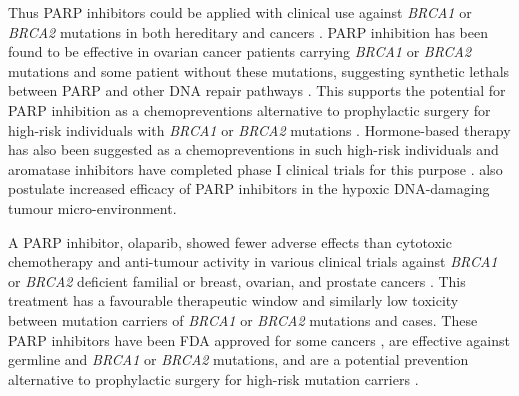 Thus \gls{PARP} inhibitors could be applied with clinical use against \textit{BRCA1} or \textit{BRCA2} \glspl{mutation} in both \gls{hereditary} and  cancers \citep{Ashworth2008, Kaelin2005}. \gls{PARP} inhibition has been found to be effective in ovarian cancer patients carrying \textit{BRCA1} or \textit{BRCA2} \glspl{mutation} and some patient without these \glspl{mutation}, suggesting \glspl{synthetic lethal} between \gls{PARP} and other \acrshort{DNA} repair \glspl{pathway} \citep{Strom2012}. This supports the potential for \gls{PARP} inhibition as a  \glspl{chemoprevention} alternative to prophylactic surgery for high-risk individuals with \textit{BRCA1} or \textit{BRCA2} \glspl{mutation} \citep{Strom2012}. Hormone-based therapy has also been suggested as a  \glspl{chemoprevention} in such high-risk individuals and aromatase inhibitors have completed phase I clinical trials for this purpose \citep{Bozovic-Spasojevic2012}. \citet{Strom2012} also postulate increased efficacy of \gls{PARP} inhibitors in the hypoxic \acrshort{DNA}-damaging tumour micro-environment.  

A \gls{PARP} inhibitor, olaparib, showed fewer adverse effects than cytotoxic \gls{chemotherapy} and anti-tumour activity in various clinical trials against \textit{BRCA1} or \textit{BRCA2} deficient \gls{familial} or  breast, ovarian, and prostate cancers \citep{Fong2009, Fong2010, Tutt2010, Audeh2010}. 
This treatment has a favourable therapeutic window and similarly low toxicity between \gls{mutation} carriers of \textit{BRCA1} or \textit{BRCA2} \glspl{mutation} and  cases. 
These \gls{PARP} inhibitors have been FDA approved for some cancers \cite{McLachlan2016}, are effective against \gls{germline} and  \textit{BRCA1} or \textit{BRCA2} \glspl{mutation}, and are a potential prevention alternative to prophylactic surgery for high-risk \gls{mutation} carriers \cite{Strom2012}. 

